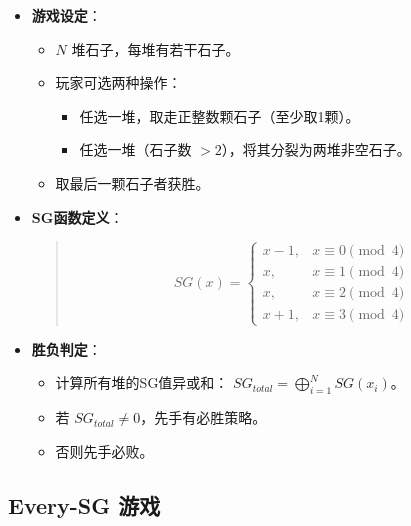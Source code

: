 \documentclass[a4paper,12pt]{article}
\begin{document}
\begin{itemize}
    \item \textbf{游戏设定}：
    \begin{itemize}
        \item $N$ 堆石子，每堆有若干石子。
        \item 玩家可选两种操作：
        \begin{itemize}
            \item 任选一堆，取走正整数颗石子（至少取1颗）。
            \item 任选一堆（石子数 $> 2$），将其分裂为两堆非空石子。
        \end{itemize}
        \item 取最后一颗石子者获胜。
    \end{itemize}
    
    \item \textbf{SG函数定义}：
    \begin{quote}
        \[ 
            SG(x) =
            \begin{cases} 
            x - 1, & x \equiv 0 \pmod{4} \\
            x,     & x \equiv 1 \pmod{4} \\
            x,     & x \equiv 2 \pmod{4} \\
            x + 1, & x \equiv 3 \pmod{4}
            \end{cases}
        \]
    \end{quote}
    
    \item \textbf{胜负判定}：
    \begin{itemize}
        \item 计算所有堆的SG值异或和：
        \( SG_{total} = \bigoplus_{i=1}^N SG(x_i) \)。
        \item 若 $SG_{total} \neq 0$，先手有必胜策略。
        \item 否则先手必败。
    \end{itemize}
\end{itemize}

\subsection{Every-SG 游戏}
\end{document}
